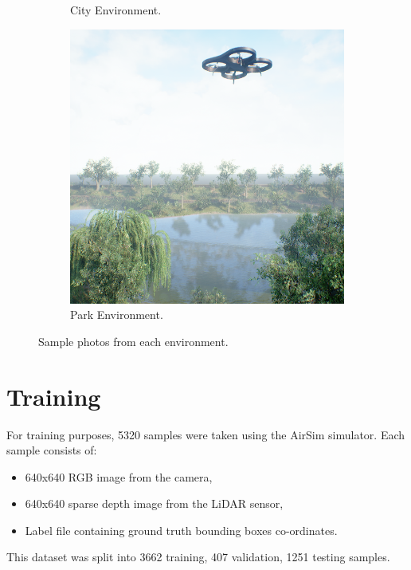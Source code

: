 \documentclass[twoside]{ctuthesis}
\theoremstyle{plain}
\theoremstyle{definition}
\theoremstyle{note}
\begin{document}
\begin{figure}
\begin{subfigure}[b]{0.3\textwidth}
		\caption{City Environment.}
	\end{subfigure}
	\hfill
	\begin{subfigure}[b]{0.3\textwidth}
		\centering
		\includegraphics[width=\textwidth]{park_rgb.png}
		\caption{Park Environment.}
	\end{subfigure}
	\caption{Sample photos from each environment.}
\end{figure}
\section{Training}
For training purposes, 5320 samples were taken using the AirSim simulator. Each sample consists of:
\begin{itemize}
	\item 640x640 RGB image from the camera,
	\item 640x640 sparse depth image from the LiDAR sensor,
	\item Label file containing ground truth bounding boxes co-ordinates.
\end{itemize}
This dataset was split into 3662 training, 407 validation, 1251 testing samples.
\end{document}
